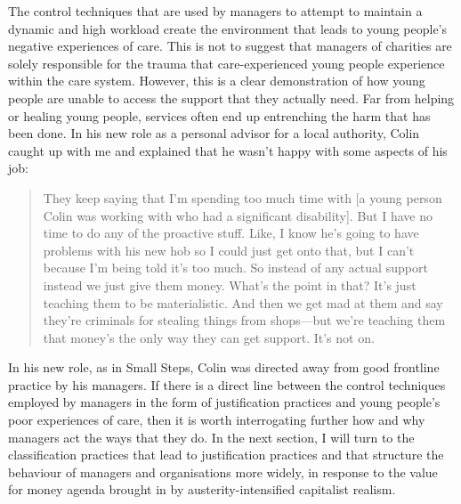 The control techniques that are used by managers to attempt to maintain a dynamic and high workload create the environment that leads to young people's negative experiences of care. This is not to suggest that managers of charities are solely responsible for the trauma that care-experienced young people experience within the care system. However, this is a clear demonstration of how young people are unable to access the support that they actually need. Far from helping or healing young people, services often end up entrenching the harm that has been done. In his new role as a personal advisor for a local authority, Colin caught up with me and explained that he wasn't happy with some aspects of his job:
\begin{quote}
They keep saying that I'm spending too much time with [a young person Colin was working with who had a significant disability]. But I have no time to do any of the proactive stuff. Like, I know he's going to have problems with his new hob so I could just get onto that, but I can't because I'm being told it's too much. So instead of any actual support instead we just give them money. What's the point in that? It's just teaching them to be materialistic. And then we get mad at them and say they're criminals for stealing things from shops—but we're teaching them that money's the only way they can get support. It's not on.
\end{quote}
In his new role, as in Small Steps, Colin was directed away from good frontline practice by his managers. If there is a direct line between the control techniques employed by managers in the form of justification practices and young people's poor experiences of care, then it is worth interrogating further how and why managers act the ways that they do. In the next section, I will turn to the classification practices that lead to justification practices and that structure the behaviour of managers and organisations more widely, in response to the value for money agenda brought in by austerity-intensified capitalist realism.

